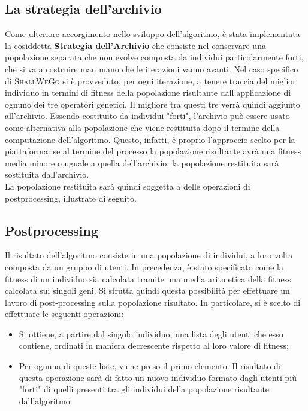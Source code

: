         \subsection{La strategia dell'archivio}
            Come ulteriore accorgimento nello sviluppo dell'algoritmo, è stata implementata la cosiddetta \textbf{Strategia dell'Archivio} che consiste nel conservare una popolazione separata che non evolve composta da individui particolarmente forti, che si va a costruire man mano che le iterazioni vanno avanti. Nel caso specifico di \textsc{ShallWeGo} si è provveduto, per ogni iterazione, a tenere traccia del miglior individuo in termini di fitness della popolazione risultante dall'applicazione di ognuno dei tre operatori genetici. Il migliore tra questi tre verrà quindi aggiunto all'archivio.
            Essendo costituito da individui "forti", l'archivio può essere usato come alternativa alla popolazione che viene restituita dopo il termine della computazione dell'algoritmo. Questo, infatti, è proprio l'approccio scelto per la piattaforma: se al termine del processo la popolazione risultante avrà una fitness media minore o uguale a quella dell'archivio, la popolazione restituita sarà sostituita dall'archivio. \\
            La popolazione restituita sarà quindi soggetta a delle operazioni di postprocessing, illustrate di seguito.

        \subsection{Postprocessing}
            Il risultato dell'algoritmo consiste in una popolazione di individui, a loro volta composta da un gruppo di utenti. In precedenza, è stato specificato come la fitness di un individuo sia calcolata tramite una media aritmetica della fitness calcolata sui singoli geni. Si sfrutta quindi questa possibilità per effettuare un lavoro di post-processing sulla popolazione risultato. In particolare, si è scelto di effettuare le seguenti operazioni:

            \begin{itemize}
                \item Si ottiene, a partire dal singolo individuo, una lista degli utenti che esso contiene, ordinati in maniera decrescente rispetto al loro valore di fitness;
                \item Per ognuna di queste liste, viene preso il primo elemento. Il risultato di questa operazione sarà di fatto un nuovo individuo formato dagli utenti più "forti" di quelli presenti tra gli individui della popolazione risultante dall'algoritmo.
            \end{itemize}

